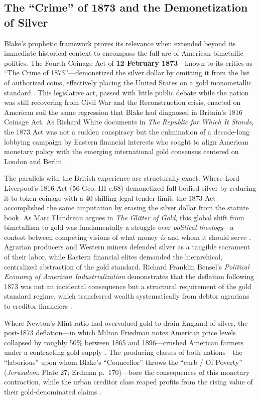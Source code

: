 \documentclass[
]{article}
\begin{document}
\subsection{The ``Crime'' of 1873 and the Demonetization of
Silver}\label{the-crime-of-1873-and-the-demonetization-of-silver}

Blake's prophetic framework proves its relevance when extended beyond
its immediate historical context to encompass the full arc of American
bimetallic politics. The Fourth Coinage Act of \textbf{12 February
1873}---known to its critics as ``The Crime of 1873''---demonetized the
silver dollar by omitting it from the list of authorized coins,
effectively placing the United States on a gold monometallic standard
\citep{laughlin1898bimetallism}. This legislative act, passed with
little public debate while the nation was still recovering from Civil
War and the Reconstruction crisis, enacted on American soil the same
regression that Blake had diagnosed in Britain's 1816 Coinage Act. As
Richard White documents in \emph{The Republic for Which It Stands}, the
1873 Act was not a sudden conspiracy but the culmination of a
decade-long lobbying campaign by Eastern financial interests who sought
to align American monetary policy with the emerging international gold
consensus centered on London and Berlin \citep{white2017republic}.

The parallels with the British experience are structurally exact. Where
Lord Liverpool's 1816 Act (56 Geo. III c.68) demonetized full-bodied
silver by reducing it to token coinage with a 40-shilling legal tender
limit, the 1873 Act accomplished the same amputation by erasing the
silver dollar from the statute book. As Marc Flandreau argues in
\emph{The Glitter of Gold}, this global shift from bimetallism to gold
was fundamentally a struggle over \emph{political theology}---a contest
between competing visions of what money \emph{is} and whom it should
serve \citep{flandreau2004glitter}. Agrarian producers and Western
miners defended silver as a tangible sacrament of their labor, while
Eastern financial elites demanded the hierarchical, centralized
abstraction of the gold standard. Richard Franklin Bensel's
\emph{Political Economy of American Industrialization} demonstrates that
the deflation following 1873 was not an incidental consequence but a
structural requirement of the gold standard regime, which transferred
wealth systematically from debtor agrarians to creditor financiers
\citep{bensel2000political}.

Where Newton's Mint ratio had overvalued gold to drain England of
silver, the post-1873 deflation---in which Milton Friedman notes
American price levels collapsed by roughly 50\% between 1865 and
1896---crushed American farmers under a contracting gold supply
\citep{friedman1963monetary}. The producing classes of both
nations---the ``laborious'' upon whom Blake's ``Councellor'' throws the
``curb / Of Poverty'' (\emph{Jerusalem}, Plate 27; Erdman p.~170)---bore
the consequences of this monetary contraction, while the urban creditor
class reaped profits from the rising value of their gold-denominated
claims \citep{delmar1895history, erdman1988complete}.
\end{document}
